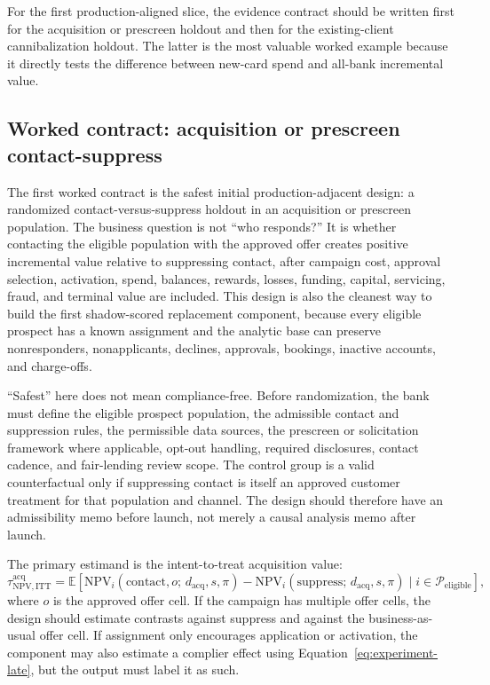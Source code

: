 \documentclass[11pt]{article}
\newcommand{\E}{\mathbb{E}}
\newcommand{\NPV}{\mathrm{NPV}}
\newcommand{\1}{\mathbf{1}}
\begin{document}
For the first production-aligned slice, the evidence contract should be
written first for the acquisition or prescreen holdout and then for the
existing-client cannibalization holdout. The latter is the most valuable
worked example because it directly tests the difference between new-card
spend and all-bank incremental value.

\subsection{Worked contract: acquisition or prescreen contact-suppress}
\label{subsec:worked-acquisition-contract}

The first worked contract is the safest initial production-adjacent design:
a randomized contact-versus-suppress holdout in an acquisition or prescreen
population. The business question is not ``who responds?'' It is whether
contacting the eligible population with the approved offer creates positive
incremental value relative to suppressing contact, after campaign cost,
approval selection, activation, spend, balances, rewards, losses, funding,
capital, servicing, fraud, and terminal value are included. This design is
also the cleanest way to build the first shadow-scored replacement component,
because every eligible prospect has a known assignment and the analytic base
can preserve nonresponders, nonapplicants, declines, approvals, bookings,
inactive accounts, and charge-offs.

``Safest'' here does not mean compliance-free. Before randomization, the bank
must define the eligible prospect population, the admissible contact and
suppression rules, the permissible data sources, the prescreen or solicitation
framework where applicable, opt-out handling, required disclosures, contact
cadence, and fair-lending review scope. The control group is a valid
counterfactual only if suppressing contact is itself an approved customer
treatment for that population and channel. The design should therefore have an
admissibility memo before launch, not merely a causal analysis memo after
launch.

The primary estimand is the intent-to-treat acquisition value:
\begin{equation}
  \tau^{\mathrm{acq}}_{\NPV,\mathrm{ITT}}
  =
  \E[
    \NPV_i(\mathrm{contact},o;\,d_{\mathrm{acq}},s,\pi)
    -
    \NPV_i(\mathrm{suppress};\,d_{\mathrm{acq}},s,\pi)
    \mid i\in\mathcal{P}_{\mathrm{eligible}}
  ],
  \label{eq:worked-acq-itt}
\end{equation}
where $o$ is the approved offer cell. If the campaign has multiple offer
cells, the design should estimate contrasts against suppress and against the
business-as-usual offer cell. If assignment only encourages application or
activation, the component may also estimate a complier effect using
Equation~\eqref{eq:experiment-late}, but the output must label it as such.
\end{document}
